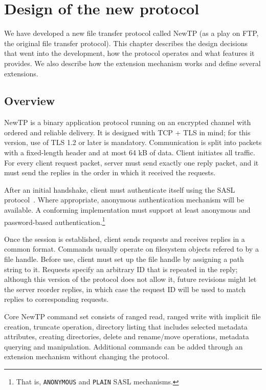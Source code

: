 
\chapter{Design of the new protocol}

We have developed a new file transfer protocol called NewTP (as a play on FTP, the original file transfer
protocol). This chapter describes the design decisions that went into the development, how the protocol
operates and what features it provides. We also describe how the extension mechanism works and define several
extensions.


\section{Overview}

NewTP is a binary application protocol running on an encrypted channel with ordered and reliable delivery. It
is designed with TCP + TLS in mind; for this version, use of TLS 1.2 or later is mandatory. Communication is
split into packets with a fixed-length header and at most 64 kB of data. Client initiates all traffic. For
every client request packet, server must send exactly one reply packet, and it must send the replies in the
order in which it received the requests.

After an initial handshake, client must authenticate itself using the SASL protocol~\cite{rfc4422}. Where
appropriate, anonymous authentication mechanism will be available. A conforming implementation must support at
least anonymous and password-based authentication.\footnote{That is, {\tt ANONYMOUS} and {\tt PLAIN} SASL
mechanisms.}

Once the session is established, client sends requests and receives replies in a common format. Commands
usually operate on filesystem objects refered to by a file handle. Before use, client must set up the file
handle by assigning a path string to it. Requests specify an arbitrary ID that is repeated in the reply;
although this version of the protocol does not allow it, future revisions might let the server reorder
replies, in which case the request ID will be used to match replies to corresponding requests.

Core NewTP command set consists of ranged read, ranged write with implicit file creation, truncate operation,
directory listing that includes selected metadata attributes, creating directories, delete and rename/move
operations, metadata querying and manipulation. Additional commands can be added through an extension
mechanism without changing the protocol.

